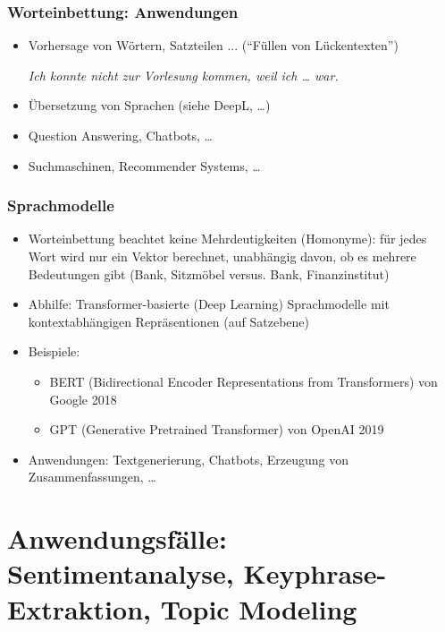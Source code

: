 \begin{frame}
    \frametitle{Worteinbettung: Anwendungen}

    \begin{itemize}
        \item Vorhersage von Wörtern, Satzteilen ... ("`Füllen von Lückentexten"')

        \textit{Ich konnte nicht zur Vorlesung kommen, weil ich \dots\xspace war.}
        
        \item Übersetzung von Sprachen (siehe DeepL, \dots)
        \item Question Answering, Chatbots, \dots
        \item Suchmaschinen, Recommender Systems, \dots
    \end{itemize}
\end{frame}


\begin{frame}
    \frametitle{Sprachmodelle}

    \begin{itemize}
     \item Worteinbettung beachtet keine Mehrdeutigkeiten (Homonyme): für jedes Wort wird nur ein Vektor berechnet, unabhängig davon, ob es mehrere Bedeutungen gibt (Bank, Sitzmöbel versus. Bank, Finanzinstitut)
     \item Abhilfe: Transformer-basierte (Deep Learning) Sprachmodelle mit kontextabhängigen Repräsentionen (auf Satzebene)
     \item Beispiele:
     \begin{itemize}
        \item BERT (Bidirectional Encoder Representations from Transformers) von Google 2018
     \item GPT (Generative Pretrained Transformer) von OpenAI 2019
    \end{itemize}
    \item Anwendungen: Textgenerierung, Chatbots, Erzeugung von Zusammenfassungen, \dots
    \end{itemize}
\end{frame}


\section{Anwendungsfälle: Sentimentanalyse, Keyphrase-Extraktion, Topic Modeling}

